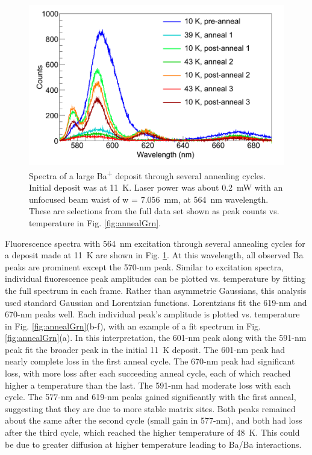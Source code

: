 \begin{figure} %
        \centering
                \includegraphics[width=.8\textwidth]{figures/spectra_annealing.png}
                \caption{Spectra of a large Ba\textsuperscript{+} deposit through several annealing cycles.  Initial deposit was at 11~K.  Laser power was about 0.2~mW with an unfocused beam waist of w = 7.056~mm, at 564~nm wavelength.  These are selections from the full data set shown as peak counts vs. temperature in Fig. \ref{fig:annealGrn}.  \cite{Mong2015}}
\label{fig:specAnneal}
\end{figure}

Fluorescence spectra with 564~nm excitation through several annealing cycles for a deposit made at 11~K are shown in Fig. \ref{fig:specAnneal}.  At this wavelength, all observed Ba peaks are prominent except the 570-nm peak.  Similar to excitation spectra, individual fluorescence peak amplitudes can be plotted vs. temperature by fitting the full spectrum in each frame.  Rather than asymmetric Gaussians, this analysis used standard Gaussian and Lorentzian functions.  Lorentzians fit the 619-nm and 670-nm peaks well.  Each individual peak's amplitude is plotted vs. temperature in Fig. \ref{fig:annealGrn}(b-f), with an example of a fit spectrum in Fig. \ref{fig:annealGrn}(a).  In this interpretation, the 601-nm peak along with the 591-nm peak fit the broader peak in the initial 11~K deposit.  The 601-nm peak had nearly complete loss in the first anneal cycle.  The 670-nm peak had significant loss, with more loss after each succeeding anneal cycle, each of which reached higher a temperature than the last.  The 591-nm had moderate loss with each cycle.  The 577-nm and 619-nm peaks gained significantly with the first anneal, suggesting that they are due to more stable matrix sites.  Both peaks remained about the same after the second cycle (small gain in 577-nm), and both had loss after the third cycle, which reached the higher temperature of 48~K. This could be due to greater diffusion at higher temperature leading to Ba/Ba interactions.

